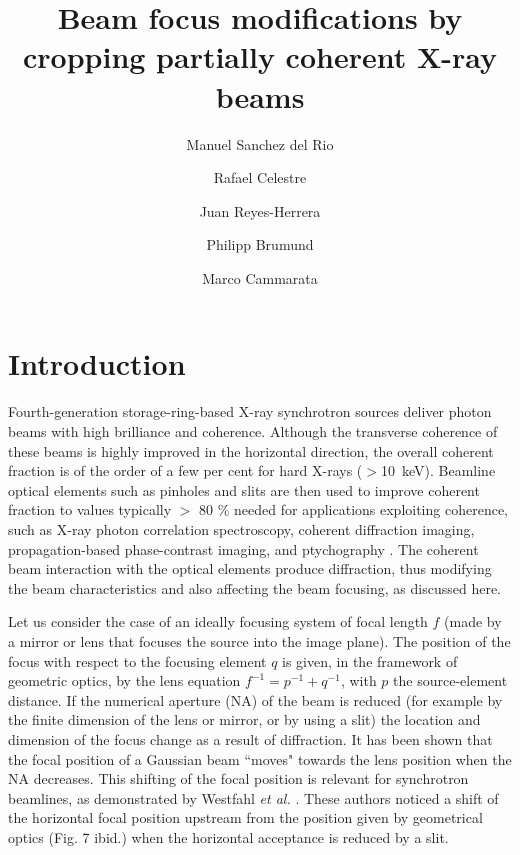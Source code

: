 \documentclass[9pt,twocolumn,twoside]{osajnl}
\title{Beam focus modifications by cropping partially coherent X-ray beams}
\author[1*]{Manuel Sanchez del Rio}
\author[1]{Rafael Celestre}
\author[1]{Juan Reyes-Herrera}
\author[1]{Philipp Brumund}
\author[1]{Marco Cammarata}
\affil[1]{European Synchrotron Radiation Facility, 71 Avenue des Martyrs, 38000 Grenoble}
\affil[*]{Corresponding author: srio@esrf.eu}
\begin{document}
\maketitle

\section{Introduction}
\label{sec:introduction}
Fourth-generation storage-ring-based X-ray synchrotron sources deliver photon beams with high brilliance and coherence. Although the transverse coherence of these beams is highly improved in the horizontal direction, 
the overall coherent fraction is of the order of a few per cent for hard X-rays ($>$10~keV). Beamline optical elements such as pinholes and slits are then used to improve coherent fraction to values typically $>$ 80 \% needed for applications exploiting coherence, such as X-ray photon correlation spectroscopy, coherent diffraction imaging, propagation-based phase-contrast imaging, and ptychography \cite{paganin_book}. The coherent beam interaction with the optical elements produce diffraction, thus modifying the beam characteristics and also affecting the beam focusing, as discussed here.




Let us consider the case of an ideally focusing system of focal length $f$ (made by a mirror or lens that focuses the source into the image plane). The position of the focus with respect to the focusing element $q$ is given, in the framework of geometric optics, by the lens equation $f^{-1}=p^{-1}+q^{-1}$, with $p$ the source-element distance. If the numerical aperture (NA) of the beam is reduced (for example by the finite dimension of the lens or mirror, or by using a slit) the location and dimension of the focus change as a result of diffraction. It has been shown \cite{Tanaka:85} that the focal position of a Gaussian beam ``moves" towards the lens position when the NA decreases. This shifting of the focal position is relevant for synchrotron beamlines, as demonstrated by Westfahl {\it et al.} \cite{westfahl}. These authors noticed a shift of the horizontal focal position upstream from the position given by geometrical optics (Fig. 7 ibid.) when the horizontal acceptance is reduced by a slit. 
\end{document}
